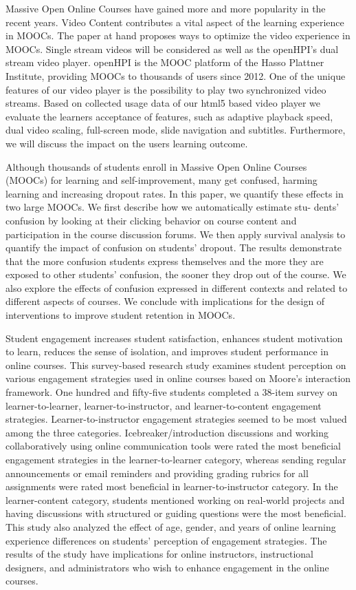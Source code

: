 Massive Open Online Courses have gained more and more popularity in the recent years. Video Content contributes a vital aspect of the learning experience in MOOCs. The paper at hand proposes ways to optimize the video experience in MOOCs. Single stream videos will be considered as well as the openHPI's dual stream video player. openHPI is the MOOC platform of the Hasso Plattner Institute, providing MOOCs to thousands of users since 2012. One of the unique features of our video player is the possibility to play two synchronized video streams. Based on collected usage data of our html5 based video player we evaluate the learners acceptance of features, such as adaptive playback speed, dual video scaling, full-screen mode, slide navigation and subtitles. Furthermore, we will discuss the impact on the users learning outcome.\cite{Renz2015}


Although thousands of students enroll in Massive Open Online Courses (MOOCs) for learning and self-improvement, many get confused, harming learning and increasing dropout rates. In this paper, we quantify these effects in two large MOOCs. We first describe how we automatically estimate stu- dents’ confusion by looking at their clicking behavior on course content and participation in the course discussion forums. We then apply survival analysis to quantify the impact of confusion on students’ dropout. The results demonstrate that the more confusion students express themselves and the more they are exposed to other students’ confusion, the sooner they drop out of the course. We also explore the effects of confusion expressed in different contexts and related to different aspects of courses. We conclude with implications for the design of interventions to improve student retention in MOOCs.\cite{Yang2016}

Student engagement increases student satisfaction, enhances student motivation to learn, reduces the sense of isolation, and improves student performance in online courses. This survey-based research study examines student perception on various engagement strategies used in online courses based on Moore’s interaction framework. One hundred and fifty-five students completed a 38-item survey on learner-to-learner, learner-to-instructor, and learner-to-content engagement strategies. Learner-to-instructor engagement strategies seemed to be most valued among the three categories. Icebreaker/introduction discussions and working collaboratively using online communication tools were rated the most beneficial engagement strategies in the learner-to-learner category, whereas sending regular announcements or email reminders and providing grading rubrics for all assignments were rated most beneficial in learner-to-instructor category. In the learner-content category, students mentioned working on real-world projects and having discussions with structured or guiding questions were the most beneficial. This study also analyzed the effect of age, gender, and years of online learning experience differences on students’ perception of engagement strategies. The results of the study have implications for online instructors, instructional designers, and administrators who wish to enhance engagement in the online courses.\cite{Martin2018(2)}



